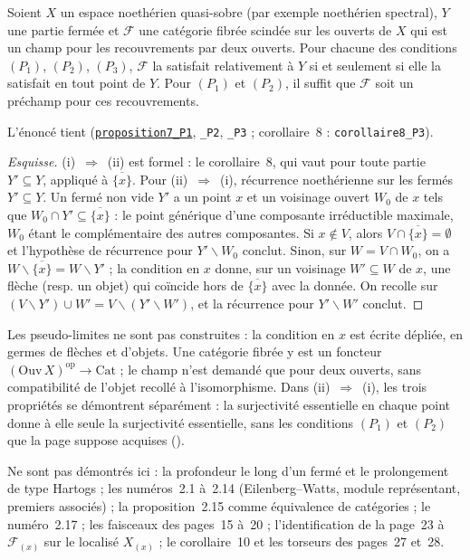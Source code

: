 \begin{encadre}
\begin{theoreme}
Soient $X$ un espace noethérien quasi-sobre (par exemple noethérien spectral), $Y$ une partie fermée et $\mathcal F$ une catégorie fibrée scindée sur les ouverts de $X$ qui est un champ pour les recouvrements par deux ouverts. Pour chacune des conditions $(P_1)$, $(P_2)$, $(P_3)$, $\mathcal F$ la satisfait relativement à $Y$ si et seulement si elle la satisfait en tout point de $Y$. Pour $(P_1)$ et $(P_2)$, il suffit que $\mathcal F$ soit un préchamp pour ces recouvrements.
\end{theoreme}
\end{encadre}

\noindent L'énoncé tient (\href{\leanblob/RingTheory/Folder21.lean}{\texttt{proposition7\_P1}}, \texttt{\_P2}, \texttt{\_P3} ; corollaire~8 : \texttt{corollaire8\_P3}).

\begin{proof}[Esquisse]
(i)~$\Rightarrow$~(ii) est formel : le corollaire~8, qui vaut pour toute partie $Y' \subseteq Y$, appliqué à $\overline{\{x\}}$. Pour (ii)~$\Rightarrow$~(i), récurrence noethérienne sur les fermés $Y' \subseteq Y$. Un fermé non vide $Y'$ a un point $x$ et un voisinage ouvert $W_0$ de $x$ tels que $W_0 \cap Y' \subseteq \overline{\{x\}}$ : le point générique d'une composante irréductible maximale, $W_0$ étant le complémentaire des autres composantes. Si $x \notin V$, alors $V \cap \overline{\{x\}} = \emptyset$ et l'hypothèse de récurrence pour $Y' \smallsetminus W_0$ conclut. Sinon, sur $W = V \cap W_0$, on a $W \smallsetminus \overline{\{x\}} = W \smallsetminus Y'$ ; la condition en $x$ donne, sur un voisinage $W' \subseteq W$ de $x$, une flèche (resp. un objet) qui coïncide hors de $\overline{\{x\}}$ avec la donnée. On recolle sur $(V \smallsetminus Y') \cup W' = V \smallsetminus (Y' \smallsetminus W')$, et la récurrence pour $Y' \smallsetminus W'$ conclut.
\end{proof}

\begin{remarque}
Les pseudo-limites ne sont pas construites : la condition en $x$ est écrite dépliée, en germes de flèches et d'objets. Une catégorie fibrée y est un foncteur $(\mathrm{Ouv}\,X)^{\mathrm{op}} \to \mathrm{Cat}$ ; le champ n'est demandé que pour deux ouverts, sans compatibilité de l'objet recollé à l'isomorphisme. Dans (ii)~$\Rightarrow$~(i), les trois propriétés se démontrent séparément : la surjectivité essentielle en chaque point donne à elle seule la surjectivité essentielle, sans les conditions $(P_1)$ et $(P_2)$ que la page suppose acquises ().
\end{remarque}

Ne sont pas démontrés ici : la profondeur le long d'un fermé et le prolongement de type Hartogs ; les numéros~2.1 à~2.14 (Eilenberg--Watts, module représentant, premiers associés) ; la proposition~2.15 comme équivalence de catégories ; le numéro~2.17 ; les faisceaux des pages~15 à~20 ; l'identification de la page~23 à $\mathcal F_{(x)}$ sur le localisé $X_{(x)}$ ; le corollaire~10 et les torseurs des pages~27 et~28.
